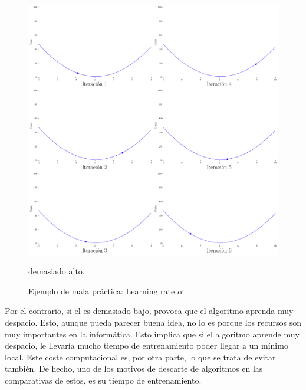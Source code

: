 \begin{figure}[H]
    \centering
    \includegraphics[scale = 0.25]{imgs/lr_alto.png}
    \caption{Ejemplo de mala práctica: Learning rate $\alpha$} demasiado alto.
    \label{lr_alto}
\end{figure}

Por el contrario, si el  es demasiado bajo, provoca que el algoritmo aprenda muy despacio. Esto, aunque pueda parecer buena idea, no lo es porque los recursos son muy importantes en la informática. Esto implica que si el algoritmo aprende muy despacio, le llevaría mucho tiempo de entrenamiento poder llegar a un mínimo local. Este coste computacional es, por otra parte, lo que se trata de evitar también. De hecho, uno de los motivos de descarte de algoritmos en las comparativas de estos, es su tiempo de entrenamiento.  



